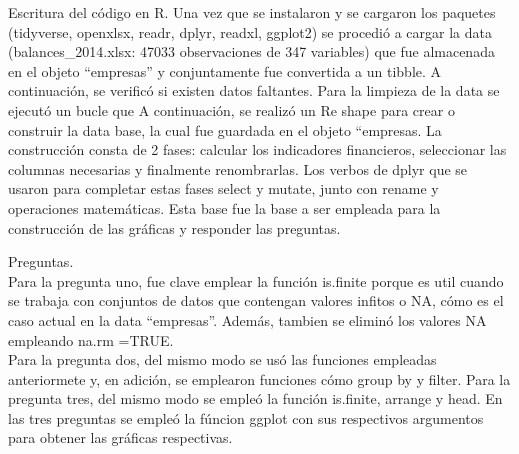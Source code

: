 \documentclass[
]{article}
\begin{document}
Escritura del código en R. Una vez que se instalaron y se cargaron los
paquetes (tidyverse, openxlsx, readr, dplyr, readxl, ggplot2) se
procedió a cargar la data (balances\_2014.xlsx: 47033 observaciones de
347 variables) que fue almacenada en el objeto ``empresas'' y
conjuntamente fue convertida a un tibble. A continuación, se verificó si
existen datos faltantes. Para la limpieza de la data se ejecutó un bucle
que A continuación, se realizó un Re shape para crear o construir la
data base, la cual fue guardada en el objeto ``empresas. La construcción
consta de 2 fases: calcular los indicadores financieros, seleccionar las
columnas necesarias y finalmente renombrarlas. Los verbos de dplyr que
se usaron para completar estas fases select y mutate, junto con rename y
operaciones matemáticas. Esta base fue la base a ser empleada para la
construcción de las gráficas y responder las preguntas.

Preguntas.\\
Para la pregunta uno, fue clave emplear la función is.finite porque es
util cuando se trabaja con conjuntos de datos que contengan valores
infitos o NA, cómo es el caso actual en la data ``empresas''. Además,
tambien se eliminó los valores NA empleando na.rm =TRUE.\\
Para la pregunta dos, del mismo modo se usó las funciones empleadas
anteriormete y, en adición, se emplearon funciones cómo group by y
filter. Para la pregunta tres, del mismo modo se empleó la función
is.finite, arrange y head. En las tres preguntas se empleó la fúncion
ggplot con sus respectivos argumentos para obtener las gráficas
respectivas.
\end{document}
